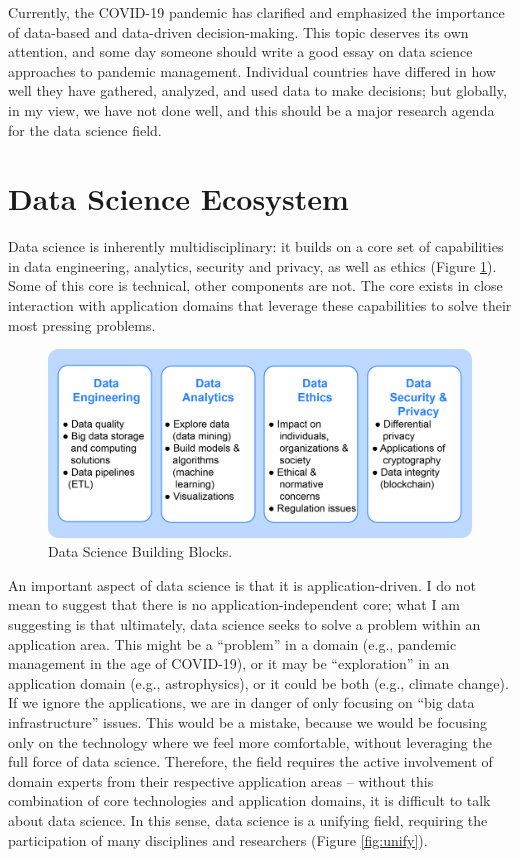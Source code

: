 \documentclass[11pt]{article}
\begin{document}
Currently, the COVID-19 pandemic has clarified and emphasized the importance of data-based and data-driven decision-making. This topic deserves its own attention, and some day someone should write a good essay on data science approaches to pandemic management. Individual countries have differed in how well they have gathered, analyzed, and used data to make decisions; but globally, in my view, we have not done well, and this should be a major research agenda for the data science field.


\section{Data Science Ecosystem}

Data science is inherently multidisciplinary: it builds on a core set of capabilities in data engineering, analytics, security and privacy, as well as ethics (Figure \ref{fig:building}). Some of this core is technical, other components are not. The core exists in close interaction with application domains that leverage these capabilities to solve their most pressing problems. 

\begin{figure}[h]
\centering
\includegraphics[scale=0.15]{letters/Figures/BuildingBlocks.jpg}
\caption{Data Science Building Blocks.}
\label{fig:building}
\end{figure}

An important aspect of data science is that it is application-driven. I do not mean to suggest that there is no application-independent core; what I am suggesting is that ultimately, data science seeks to solve a problem within an application area. This might be a ``problem'' in a domain (e.g., pandemic management in the age of COVID-19), or it may be ``exploration'' in an application domain (e.g., astrophysics), or it could be both (e.g., climate change). If we ignore the applications, we are in danger of only focusing on ``big data infrastructure'' issues. This would be a mistake, because we would be focusing only on the technology where we feel more comfortable, without leveraging the full force of data science. Therefore, the field requires the active involvement of domain experts from their respective application areas – without this combination of core technologies and application domains, it is difficult to talk about data science. In this sense, data science is a unifying field, requiring the participation of many disciplines and researchers (Figure \ref{fig:unify}).
\end{document}
